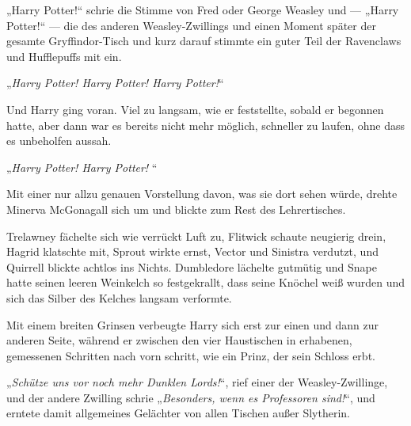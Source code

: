 „Harry Potter!“ schrie die Stimme von Fred oder George Weasley und —
„Harry Potter!“ — die des anderen Weasley-Zwillings und einen Moment später der gesamte Gryffindor-Tisch und kurz darauf stimmte ein guter Teil der Ravenclaws und Hufflepuffs mit ein.

„\emph{Harry Potter! Harry Potter! Harry Potter!}“

Und Harry ging voran. Viel zu langsam, wie er feststellte, sobald er begonnen hatte, aber dann war es bereits nicht mehr möglich, schneller zu laufen, ohne dass es unbeholfen aussah.

\later

„\emph{Harry Potter! Harry Potter! }“


Mit einer nur allzu genauen Vorstellung davon, was sie dort sehen würde, drehte Minerva McGonagall sich um und blickte zum Rest des Lehrertisches.

Trelawney fächelte sich wie verrückt Luft zu, Flitwick schaute neugierig drein, Hagrid klatschte mit, Sprout wirkte ernst, Vector und Sinistra verdutzt, und Quirrell blickte achtlos ins Nichts. Dumbledore lächelte gutmütig und Snape hatte seinen leeren Weinkelch so festgekrallt, dass seine Knöchel weiß wurden und sich das Silber des Kelches langsam verformte.

Mit einem breiten Grinsen verbeugte Harry sich erst zur einen und dann zur anderen Seite, während er zwischen den vier Haustischen in erhabenen, gemessenen Schritten nach vorn schritt, wie ein Prinz, der sein Schloss erbt.

„\emph{Schütze uns vor noch mehr Dunklen Lords!}“, rief einer der Weasley-Zwillinge, und der andere Zwilling schrie
„\emph{Besonders, wenn es Professoren sind!}“, und erntete damit allgemeines Gelächter von allen Tischen außer Slytherin.


